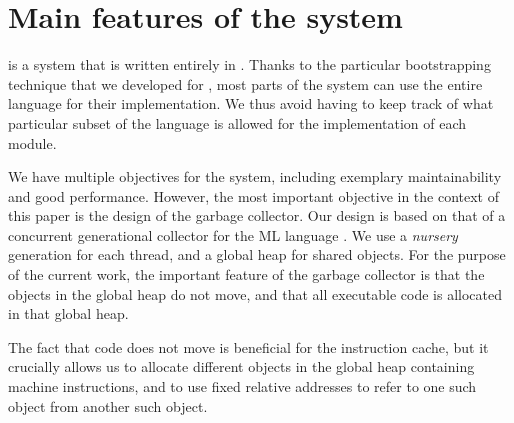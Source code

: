 \section{Main features of the \sicl{} system}
\label{sec-sicl-features}

\sicl{} is a system that is written entirely in \commonlisp{}.  Thanks
to the particular bootstrapping technique
\cite{durand_irene_2019_2634314} that we developed for \sicl{}, most
parts of the system can use the entire language for their
implementation.  We thus avoid having to keep track of what particular
subset of the language is allowed for the implementation of each
module.

We have multiple objectives for the \sicl{} system, including
exemplary maintainability and good performance.  However, the most
important objective in the context of this paper is the design of the
garbage collector.  Our design is based on that of a concurrent
generational collector for the ML language \cite{Doligez:1993:CGG}.
We use a \emph{nursery} generation for each thread, and a global heap
for shared objects.  For the purpose of the current work, the
important feature of the garbage collector is that the objects in the
global heap do not move, and that all executable code is allocated in
that global heap.

The fact that code does not move is beneficial for the instruction
cache, but it crucially allows us to allocate different objects in the
global heap containing machine instructions, and to use fixed relative
addresses to refer to one such object from another such object.
